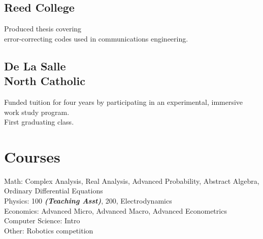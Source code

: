 \documentclass[]{deemweaver}
\begin{document}
\begin{minipage}[t]{0.33\textwidth}
\subsection{Reed College}
Produced thesis covering \\ error-correcting codes used in communications engineering.
\sectionsep

\subsection{De La Salle \protect\\ North Catholic}
Funded tuition for four years by participating in an experimental,
immersive work study program. \\First graduating class.
\sectionsep

\section{Courses}

Math: Complex Analysis, Real Analysis, Advanced Probability, Abstract Algebra, Ordinary Differential Equations \\
Physics: 100 {\footnotesize \textit{\textbf{(Teaching Asst)}}}, 200, Electrodynamics \\
Economics: Advanced Micro, Advanced Macro, Advanced Econometrics\\
Computer Science: Intro \\
Other: Robotics competition
%
%

\end{minipage} 
\hfill
\end{document}
